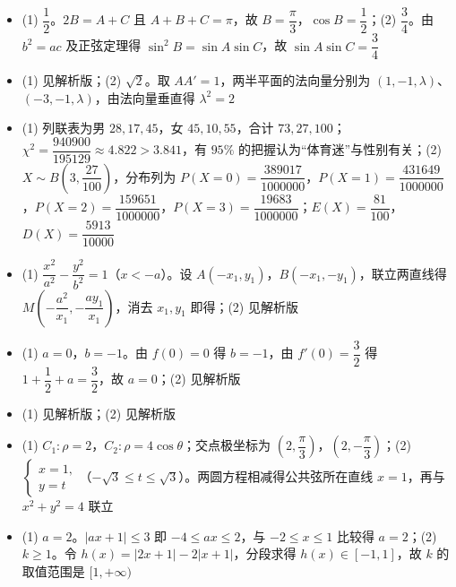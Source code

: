 \begin{itemize}[leftmargin=2.6em]
  \item[\textbf{17.}] (1) $\dfrac12$。$2B=A+C$ 且 $A+B+C=\pi$，故 $B=\dfrac\pi3$，$\cos B=\dfrac12$；(2) $\dfrac34$。由 $b^2=ac$ 及正弦定理得 $\sin^2B=\sin A\sin C$，故 $\sin A\sin C=\dfrac34$
  \item[\textbf{18.}] (1) 见解析版；(2) $\sqrt2$。取 $AA'=1$，两半平面的法向量分别为 $(1,-1,\lambda)$、$(-3,-1,\lambda)$，由法向量垂直得 $\lambda^2=2$
  \item[\textbf{19.}] (1) 列联表为男 $28,17,45$，女 $45,10,55$，合计 $73,27,100$；$\chi^2=\dfrac{940900}{195129}\approx4.822>3.841$，有 $95\%$ 的把握认为“体育迷”与性别有关；(2) $X\sim B\left(3,\dfrac{27}{100}\right)$，分布列为 $P(X=0)=\dfrac{389017}{1000000}$，$P(X=1)=\dfrac{431649}{1000000}$，$P(X=2)=\dfrac{159651}{1000000}$，$P(X=3)=\dfrac{19683}{1000000}$；$E(X)=\dfrac{81}{100}$，$D(X)=\dfrac{5913}{10000}$
  \item[\textbf{20.}] (1) $\dfrac{x^2}{a^2}-\dfrac{y^2}{b^2}=1$（$x<-a$）。设 $A(-x_1,y_1)$，$B(-x_1,-y_1)$，联立两直线得 $M\left(-\dfrac{a^2}{x_1},-\dfrac{ay_1}{x_1}\right)$，消去 $x_1,y_1$ 即得；(2) 见解析版
  \item[\textbf{21.}] (1) $a=0$，$b=-1$。由 $f(0)=0$ 得 $b=-1$，由 $f'(0)=\dfrac32$ 得 $1+\dfrac12+a=\dfrac32$，故 $a=0$；(2) 见解析版
\end{itemize}

\begin{itemize}[leftmargin=2.6em]
  \item[\textbf{22.}] (1) 见解析版；(2) 见解析版
  \item[\textbf{23.}] (1) $C_1:\rho=2$，$C_2:\rho=4\cos\theta$；交点极坐标为 $\left(2,\dfrac\pi3\right)$，$\left(2,-\dfrac\pi3\right)$；(2) $\begin{cases}x=1,\\y=t\end{cases}$（$-\sqrt3\leqslant t\leqslant\sqrt3$）。两圆方程相减得公共弦所在直线 $x=1$，再与 $x^2+y^2=4$ 联立
  \item[\textbf{24.}] (1) $a=2$。$|ax+1|\leqslant3$ 即 $-4\leqslant ax\leqslant2$，与 $-2\leqslant x\leqslant1$ 比较得 $a=2$；(2) $k\geqslant1$。令 $h(x)=|2x+1|-2|x+1|$，分段求得 $h(x)\in[-1,1]$，故 $k$ 的取值范围是 $[1,+\infty)$
\end{itemize}
